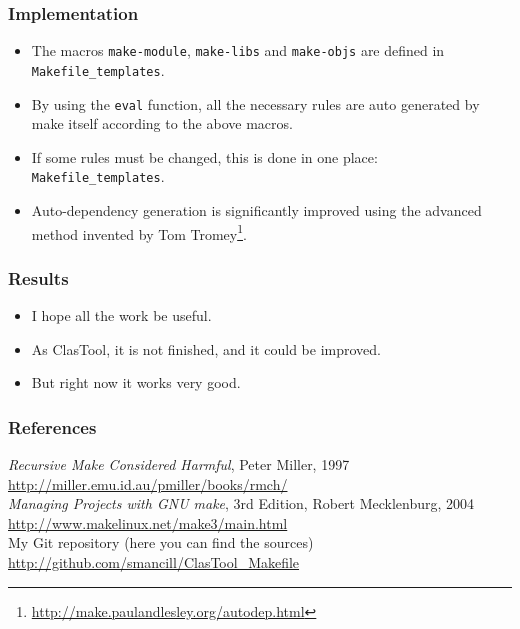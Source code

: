 \documentclass[11pt]{beamer}
\begin{document}
\begin{frame}[label=eval]
  \frametitle{Implementation}
  \begin{itemize}
    \item The macros \texttt{make-module}, \texttt{make-libs} and
      \texttt{make-objs} are defined in \texttt{Makefile\_templates}.
      \hyperlink{make-libs}{}\\[4mm]
    \item By using the \texttt{eval} function, all the necessary rules are
      auto generated by make itself according to the above macros.\\[4mm]
    \item If some rules must be changed, this is done in one place:
      \texttt{Makefile\_templates}.\\[4mm]
    \item Auto-dependency generation is significantly improved using the
      advanced method invented by Tom
      Tromey\footnote{\url{http://make.paulandlesley.org/autodep.html}}.
  \end{itemize}
\end{frame}


\begin{frame}
  \frametitle{Results}
  \begin{itemize}
    \item I hope all the work be useful.\\[5mm]
    \item As ClasTool, it is not finished, and it could be improved.\\[8mm]
    \item<2> But right now it works very good.
  \end{itemize}
\end{frame}


\begin{frame}[t]
  \frametitle{References}

  \begin{thebibliography}{99}
     \emph{Recursive Make Considered Harmful}, Peter Miller,
      1997\\
      \url{http://miller.emu.id.au/pmiller/books/rmch/}\\[7mm]
     \emph{Managing Projects with GNU make}, 3rd Edition, Robert
      Mecklenburg, 2004\\
      \url{http://www.makelinux.net/make3/main.html}\\[7mm]
     My Git repository (here you can find the sources)\\
      \url{http://github.com/smancill/ClasTool_Makefile}
  \end{thebibliography}
\end{frame}
\end{document}
